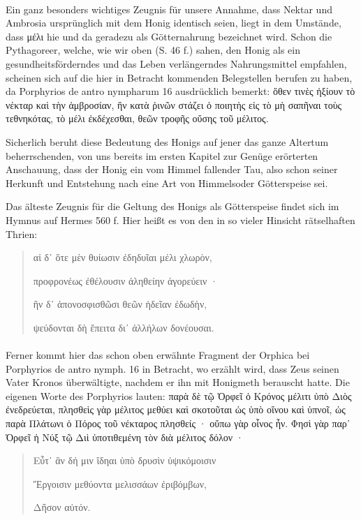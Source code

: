 \documentclass[a4paper, 11pt, oneside]{article}
\begin{document}
\paragraph{}
Ein ganz besonders wichtiges Zeugnis für unsere Annahme, dass Nektar und Ambrosia ursprünglich mit dem Honig identisch seien, liegt in dem Umstände, dass μέλι hie und da geradezu als Götternahrung bezeichnet wird. Schon die Pythagoreer, welche, wie wir oben (S. 46 f.) sahen, den Honig als ein gesundheitsförderndes und das Leben verlängerndes Nahrungsmittel empfahlen, scheinen sich auf die hier in Betracht kommenden Belegstellen berufen zu haben, da Porphyrios de antro nympharum 16 ausdrücklich bemerkt: ὅθεν τινὲς ἠξίουν τὸ νέκταρ καὶ τὴν ἀμβροσίαν, ἣν κατὰ ῥινῶν στάζει ὁ ποιητὴς εἰς τὸ μὴ σαπῆναι τοὺς τεθνηκότας, τὸ μέλι ἐκδέχεσθαι, θεῶν τροφῆς οὔσης τοῦ μέλιτος.

Sicherlich beruht diese Bedeutung des Honigs auf jener das ganze Altertum beherrschenden, von uns bereits im ersten Kapitel zur Genüge erörterten Anschauung, dass der Honig ein vom Himmel fallender Tau, also schon seiner Herkunft und Entstehung nach eine Art von Himmelsoder Götterspeise sei.

Das älteste Zeugnis für die Geltung des Honigs als Götterspeise findet sich im Hymnus auf Hermes 560 f. Hier heißt es von den in so vieler Hinsicht rätselhaften Thrien:
\begin{quotation}
αἱ δ᾽ ὅτε μὲν θυίωσιν ἐδηδυῖαι μέλι χλωρὸν,

προφρονέως ἐθέλουσιν ἀληθείην ἀγορεύειν ·

ἣν δ᾽ ἀπονοσφισθῶσι θεῶν ἡδεῖαν ἐδωδὴν,

ψεύδονται δὴ ἔπειτα δι᾽ ἀλλήλων δονέουσαι.
\end{quotation}
\paragraph{}
Ferner kommt hier das schon oben erwähnte Fragment der Orphica bei Porphyrios de antro nymph. 16 in Betracht, wo erzählt wird, dass Zeus seinen Vater Kronos überwältigte, nachdem er ihn mit Honigmeth berauscht hatte. Die eigenen Worte des Porphyrios lauten: παρὰ δὲ τῷ Ὀρφεῖ ὁ Κρόνος μέλιτι ὑπὸ Διὸς ἐνεδρεύεται, πλησθεὶς γὰρ μέλιτος μεθύει καὶ σκοτοῦται ὡς ὑπὸ οἴνου καὶ ὑπνοῖ, ὡς παρὰ Πλάτωνι ὁ Πόρος τοῦ νέκταρος πλησθείς · οὔπω γὰρ οἷνος ἦν. Φησὶ γὰρ παρ᾽ Ὀρφεῖ ἡ Νύξ τῷ Διὶ ὑποτιθεμένη τὸν διὰ μέλιτος δόλον ·
\begin{quotation}
Εὖτ᾽ ἂν δή μιν ἴδηαι ὑπὸ δρυσὶν ὑψικόμοισιν

Ἔργοισιν μεθύοντα μελισσάων ἐριβόμβων,

Δῆσον αὐτόν.
\end{quotation}
\end{document}
